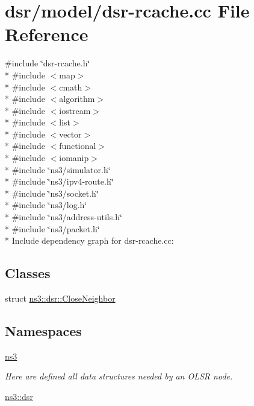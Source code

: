 \hypertarget{dsr-rcache_8cc}{}\section{dsr/model/dsr-\/rcache.cc File Reference}
\label{dsr-rcache_8cc}
{\ttfamily \#include \char`\"{}dsr-\/rcache.\+h\char`\"{}}\\*
{\ttfamily \#include $<$map$>$}\\*
{\ttfamily \#include $<$cmath$>$}\\*
{\ttfamily \#include $<$algorithm$>$}\\*
{\ttfamily \#include $<$iostream$>$}\\*
{\ttfamily \#include $<$list$>$}\\*
{\ttfamily \#include $<$vector$>$}\\*
{\ttfamily \#include $<$functional$>$}\\*
{\ttfamily \#include $<$iomanip$>$}\\*
{\ttfamily \#include \char`\"{}ns3/simulator.\+h\char`\"{}}\\*
{\ttfamily \#include \char`\"{}ns3/ipv4-\/route.\+h\char`\"{}}\\*
{\ttfamily \#include \char`\"{}ns3/socket.\+h\char`\"{}}\\*
{\ttfamily \#include \char`\"{}ns3/log.\+h\char`\"{}}\\*
{\ttfamily \#include \char`\"{}ns3/address-\/utils.\+h\char`\"{}}\\*
{\ttfamily \#include \char`\"{}ns3/packet.\+h\char`\"{}}\\*
Include dependency graph for dsr-\/rcache.cc\+:
\subsection*{Classes}
\begin{DoxyCompactItemize}
\item 
struct \hyperlink{structns3_1_1dsr_1_1CloseNeighbor}{ns3\+::dsr\+::\+Close\+Neighbor}
\end{DoxyCompactItemize}
\subsection*{Namespaces}
\begin{DoxyCompactItemize}
\item 
 \hyperlink{namespacens3}{ns3}
\begin{DoxyCompactList}\small\item\em Here are defined all data structures needed by an O\+L\+SR node. \end{DoxyCompactList}\item 
 \hyperlink{namespacens3_1_1dsr}{ns3\+::dsr}
\end{DoxyCompactItemize}
